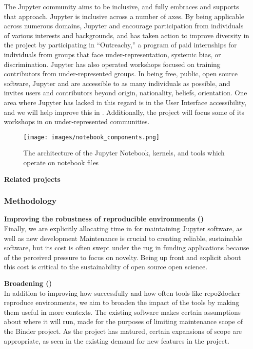 The Jupyter community aims to be inclusive, and \TheProject fully
embraces and supports that approach.  Jupyter is inclusive across a number of axes.
By being applicable across numerous domains, Jupyter and \TheProject
encourage participation from individuals of various interests and
backgrounds, and has taken action to improve diversity in the project
by participating in ``Outreachy,'' a program of paid internships for
individuals from groups that face under-representation, systemic bias,
or discrimination.  Jupyter has also operated workshops focused on
training contributors from under-represented groups.  In being free,
public, open source software, Jupyter and \TheProject are accessible
to as many individuals as possible, and invites users and contributors
beyond origin, nationality, beliefs, orientation.  One area where
Jupyter has lacked in this regard is in the User Interface
accessibility, and we will help improve this in
.  Additionally, the project will
focus some of its workshops in
on
under-represented communities.


\begin{figure}[ht!]\centering
  \texttt{[image: images/notebook\_components.png]}
  \caption{The architecture of the Jupyter Notebook, kernels, and tools
        which operate on notebook files}
  \label{fig:notebook-architecture}
\end{figure}

\medskip
\noindent\textbf{Related projects}


\subsubsection{Methodology}\label{sec:methodology}

\textbf{Improving the robustness of reproducible environments ()}\\
Finally, we are explicitly allocating time in  for maintaining
Jupyter software, as well as new development
Maintenance is crucial to creating reliable, sustainable software,
but its cost is often swept under the rug in funding applications
because of the perceived pressure to focus on novelty.
Being up front and explicit about this cost is critical to the sustainability
of open source open science.

\medskip
\noindent\textbf{Broadening  ()}\\
In addition to improving how successfully and how often tools like repo2docker reproduce environments,
we aim to broaden the impact of the tools by making them useful in more contexts.
The existing software makes certain assumptions about where it will run,
made for the purposes of limiting maintenance scope of the Binder project.
As the project has matured, certain expansions of scope are appropriate,
as seen in the existing demand for new features in the project.

